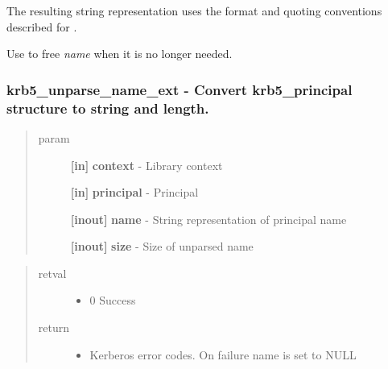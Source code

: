 \documentclass[letterpaper,10pt,english]{sphinxmanual}
\begin{document}
The resulting string representation uses the format and quoting conventions described for {\hyperref[appdev/refs/api/krb5_parse_name:c.krb5_parse_name]{}} .

Use {\hyperref[appdev/refs/api/krb5_free_unparsed_name:c.krb5_free_unparsed_name]{}} to free \emph{name} when it is no longer needed.


\subsubsection{krb5\_unparse\_name\_ext -  Convert krb5\_principal structure to string and length.}
\label{appdev/refs/api/krb5_unparse_name_ext:krb5-unparse-name-ext-convert-krb5-principal-structure-to-string-and-length}\label{appdev/refs/api/krb5_unparse_name_ext::doc}

\begin{fulllineitems}
\label{appdev/refs/api/krb5_unparse_name_ext:c.krb5_unparse_name_ext}
\end{fulllineitems}

\begin{quote}\begin{description}
\item[{param}] \leavevmode
\textbf{{[}in{]}} \textbf{context} - Library context

\textbf{{[}in{]}} \textbf{principal} - Principal

\textbf{{[}inout{]}} \textbf{name} - String representation of principal name

\textbf{{[}inout{]}} \textbf{size} - Size of unparsed name

\end{description}\end{quote}
\begin{quote}\begin{description}
\item[{retval}] \leavevmode\begin{itemize}
\item {} 
0   Success

\end{itemize}

\item[{return}] \leavevmode\begin{itemize}
\item {} 
Kerberos error codes. On failure name is set to NULL

\end{itemize}

\end{description}\end{quote}
\end{document}
